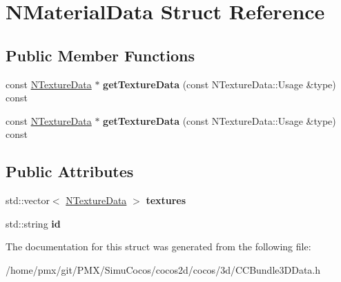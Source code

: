 \hypertarget{structNMaterialData}{}\section{N\+Material\+Data Struct Reference}
\label{structNMaterialData}
\subsection*{Public Member Functions}
\begin{DoxyCompactItemize}
\item 
\mbox{\label{structNMaterialData_ac9f5beb1ea32e085ad854b862398235a}} 
const \hyperlink{structNTextureData}{N\+Texture\+Data} $\ast$ {\bfseries get\+Texture\+Data} (const N\+Texture\+Data\+::\+Usage \&type) const
\item 
\mbox{\label{structNMaterialData_ac9f5beb1ea32e085ad854b862398235a}} 
const \hyperlink{structNTextureData}{N\+Texture\+Data} $\ast$ {\bfseries get\+Texture\+Data} (const N\+Texture\+Data\+::\+Usage \&type) const
\end{DoxyCompactItemize}
\subsection*{Public Attributes}
\begin{DoxyCompactItemize}
\item 
\mbox{\label{structNMaterialData_ad19819606eb6df9467a2d066cc150ed7}} 
std\+::vector$<$ \hyperlink{structNTextureData}{N\+Texture\+Data} $>$ {\bfseries textures}
\item 
\mbox{\label{structNMaterialData_a62235be1e96cb6409ab2ee2deb003186}} 
std\+::string {\bfseries id}
\end{DoxyCompactItemize}


The documentation for this struct was generated from the following file\+:\begin{DoxyCompactItemize}
\item 
/home/pmx/git/\+P\+M\+X/\+Simu\+Cocos/cocos2d/cocos/3d/C\+C\+Bundle3\+D\+Data.\+h\end{DoxyCompactItemize}
